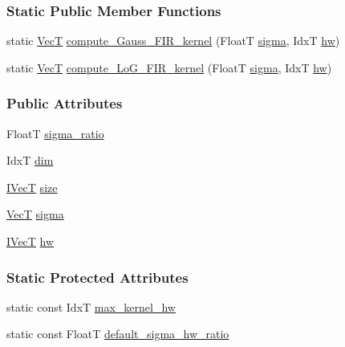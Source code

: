 \subsubsection*{Static Public Member Functions}
\begin{DoxyCompactItemize}
\item 
static \hyperlink{classboxxer_1_1DoGFilter3D_aea578fd16f3044b93be02a0a634c013d}{VecT} \hyperlink{classboxxer_1_1GaussFIRFilter_a5dd6de5fe82092ec30141ab920d75dfd}{compute\+\_\+\+Gauss\+\_\+\+F\+I\+R\+\_\+kernel} (FloatT \hyperlink{classboxxer_1_1GaussFIRFilter_a66ced06c688fd544d5f1f8be39aa2125}{sigma}, IdxT \hyperlink{classboxxer_1_1GaussFIRFilter_ae17a4e137303e452a9223ba34825e0da}{hw})
\item 
static \hyperlink{classboxxer_1_1DoGFilter3D_aea578fd16f3044b93be02a0a634c013d}{VecT} \hyperlink{classboxxer_1_1GaussFIRFilter_ad6a618b47db57b570278cc57b05d8c03}{compute\+\_\+\+Lo\+G\+\_\+\+F\+I\+R\+\_\+kernel} (FloatT \hyperlink{classboxxer_1_1GaussFIRFilter_a66ced06c688fd544d5f1f8be39aa2125}{sigma}, IdxT \hyperlink{classboxxer_1_1GaussFIRFilter_ae17a4e137303e452a9223ba34825e0da}{hw})
\end{DoxyCompactItemize}
\subsubsection*{Public Attributes}
\begin{DoxyCompactItemize}
\item 
FloatT \hyperlink{classboxxer_1_1DoGFilter3D_a91ccdf9024dd9db86ba4fc9a9651b305}{sigma\+\_\+ratio}
\item 
IdxT \hyperlink{classboxxer_1_1GaussFIRFilter_ac7adcd4d8f8efee00a65262f596c8eda}{dim}
\item 
\hyperlink{classboxxer_1_1GaussFIRFilter_a0083c8c9ab6032dd458b4dc93852c2b8}{I\+VecT} \hyperlink{classboxxer_1_1GaussFIRFilter_ac0d4e19bb2be3e8913e77283e7e4317e}{size}
\item 
\hyperlink{classboxxer_1_1DoGFilter3D_aea578fd16f3044b93be02a0a634c013d}{VecT} \hyperlink{classboxxer_1_1GaussFIRFilter_a66ced06c688fd544d5f1f8be39aa2125}{sigma}
\item 
\hyperlink{classboxxer_1_1GaussFIRFilter_a0083c8c9ab6032dd458b4dc93852c2b8}{I\+VecT} \hyperlink{classboxxer_1_1GaussFIRFilter_ae17a4e137303e452a9223ba34825e0da}{hw}
\end{DoxyCompactItemize}
\subsubsection*{Static Protected Attributes}
\begin{DoxyCompactItemize}
\item 
static const IdxT \hyperlink{classboxxer_1_1GaussFIRFilter_a7f85e018f78753ee4fedf65c04b0c65a}{max\+\_\+kernel\+\_\+hw}
\item 
static const FloatT \hyperlink{classboxxer_1_1GaussFIRFilter_a72b51cd7549510735179cb9c94f5f43f}{default\+\_\+sigma\+\_\+hw\+\_\+ratio}
\end{DoxyCompactItemize}
